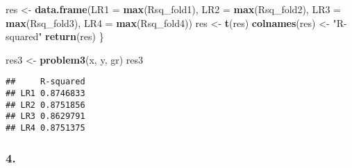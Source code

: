 \documentclass[
]{article}
\newenvironment{Shaded}{\begin{snugshade}}{\end{snugshade}}
\newcommand{\AttributeTok}[1]{\textcolor[rgb]{0.13,0.29,0.53}{#1}}
\newcommand{\FunctionTok}[1]{\textcolor[rgb]{0.13,0.29,0.53}{\textbf{#1}}}
\newcommand{\NormalTok}[1]{#1}
\newcommand{\OtherTok}[1]{\textcolor[rgb]{0.56,0.35,0.01}{#1}}
\newcommand{\StringTok}[1]{\textcolor[rgb]{0.31,0.60,0.02}{#1}}
\begin{document}
\begin{Shaded}
\begin{Highlighting}[]
\NormalTok{  res }\OtherTok{\textless{}{-}} \FunctionTok{data.frame}\NormalTok{(}\AttributeTok{LR1 =} \FunctionTok{max}\NormalTok{(Rsq\_fold1),}
                    \AttributeTok{LR2 =} \FunctionTok{max}\NormalTok{(Rsq\_fold2),}
                    \AttributeTok{LR3 =} \FunctionTok{max}\NormalTok{(Rsq\_fold3),}
                    \AttributeTok{LR4 =} \FunctionTok{max}\NormalTok{(Rsq\_fold4))}
\NormalTok{  res }\OtherTok{\textless{}{-}} \FunctionTok{t}\NormalTok{(res)}
  \FunctionTok{colnames}\NormalTok{(res) }\OtherTok{\textless{}{-}} \StringTok{"R{-}squared"}
  \FunctionTok{return}\NormalTok{(res)}
\NormalTok{\}}

\NormalTok{res3 }\OtherTok{\textless{}{-}} \FunctionTok{problem3}\NormalTok{(x, y, gr)}
\NormalTok{res3}
\end{Highlighting}
\end{Shaded}

\begin{verbatim}
##     R-squared
## LR1 0.8746833
## LR2 0.8751856
## LR3 0.8629791
## LR4 0.8751375
\end{verbatim}

\subsubsection{4.}\label{section-3}
\end{document}
